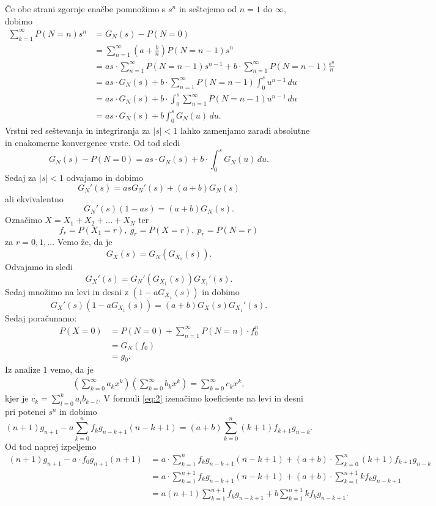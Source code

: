 \documentclass[10pt, a4paper]{article}
\begin{document}
Če obe strani zgornje enačbe pomnožimo s $s^n$ in seštejemo od $n = 1$ do $\infty$, 
dobimo 
\begin{align*}
  \sum_{k = 1} ^\infty P(N = n) s^n &= G_N (s) - P(N = 0)\\
  &= \sum_{n = 1} ^\infty \left(a + \frac{b}{n}\right) P(N = n - 1) s^n\\
  &= as \cdot \sum_{n = 1} ^\infty P(N = n - 1) s^{n - 1} + b \cdot \sum_{n = 1} ^\infty  P(N = n - 1) \frac{s^n}{n}\\
  &= as \cdot G_N (s) + b \cdot \sum_{n = 1} ^\infty P(N = n - 1) \int_0 ^s u^{n - 1}\, du\\
  &= as \cdot G_N (s) + b \cdot \int_0 ^s \sum_{n = 1} ^\infty P(N = n - 1) u^{n - 1}\, du\\
  &= as \cdot G_N (s) + b \int_0 ^s G_N (u)\, du.
\end{align*}
Vrstni red seštevanja in integriranja za $|s| < 1$ lahko zamenjamo zaradi absolutne 
in enakomerne konvergence vrste. Od tod sledi 
$$G_N (s) - P(N = 0) = as \cdot G_N (s) + b \cdot \int_0 ^s G_N (u)\, du.$$
Sedaj za $|s| < 1$ odvajamo in dobimo 
$$G_N ' (s) = as G_N ' (s) + (a + b) G_N (s)$$
ali ekvivalentno 
$$G_N ' (s) (1 - as) = (a + b) G_N (s).$$
Označimo $X = X_1 + X_2 + \dots + X_N$ ter 
$$f_r = P(X_1 = r),\ g_r = P(X = r),\ p_r = P(N = r)$$
za $r = 0, 1, \dots$ Vemo že, da je 
$$G_X (s) = G_N (G_{X_1} (s)).$$
Odvajamo in sledi 
$$G_X' (s) = G_N'(G_{X_1} (s)) G_{X_1}'(s).$$
Sedaj množimo na levi in desni z $(1 - a G_{X_1} (s))$ in dobimo 
\begin{equation}
  G_X'(s) (1 - aG_{X_1} (s)) = (a + b) G_X (s) G_{X_1}'(s). \label{eq:2}
\end{equation}
Sedaj poračunamo: 
\begin{align*}
  P(X = 0) &= P(N = 0) + \sum_{n = 1} ^\infty P(N = n) \cdot f_0^n\\
  &= G_N (f_0)\\
  &= g_0.
\end{align*}
Iz analize $1$ vemo, da je 
\begin{align*}
  \left(\sum_{k = 0} ^\infty a_k x^k\right) \left(\sum_{k = 0} ^\infty b_k x^k\right) = \sum_{k = 0} ^\infty c_k x^k,
\end{align*}
kjer je $c_k = \sum_{l = 0} ^k a_l b_{k - l}$. V formuli \eqref{eq:2} izenačimo koeficiente na levi in desni 
pri potenci $s^n$ in dobimo 
$$(n + 1) g_{n + 1} - a\sum_{k = 0} ^n f_k g_{n - k + 1} (n - k + 1) = (a + b) \sum_{k = 0} ^n (k + 1)f_{k + 1} g_{n - k}.$$
Od tod naprej izpeljemo 
\begin{align*}
  (n + 1) g_{n + 1} - a \cdot f_0 g_{n + 1} (n + 1) &= a \cdot \sum_{k = 1} ^n f_k g_{n - k + 1} (n - k + 1) + (a + b) \cdot \sum_{k = 0}^n (k + 1) f_{k + 1} g_{n - k}\\
  &= a \cdot \sum_{k = 1} ^{n + 1} f_k g_{n - k + 1} (n - k + 1) + (a + b) \cdot \sum_{k = 1}^{n + 1} k f_{k} g_{n - k + 1}\\
  &= a (n + 1) \sum_{k = 1} ^{n + 1} f_k g_{n - k + 1} + b \sum_{k = 1} ^{n + 1} k f_k g_{n - k + 1}.
\end{align*}
\end{document}

